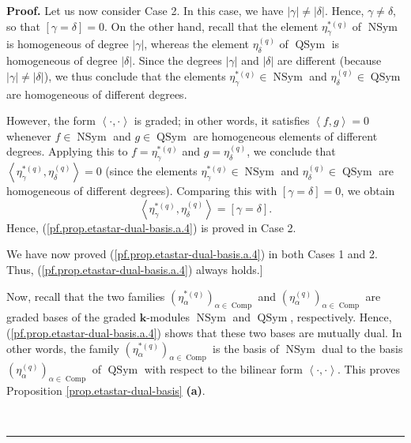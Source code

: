 \documentclass[numbers=enddot,12pt,final,onecolumn,notitlepage]{scrartcl}%
\theoremstyle{definition}
\newenvironment{proof}[1][Proof]{\noindent\textbf{#1.} }{\ \rule{0.5em}{0.5em}}
\newenvironment{verlong}{}{}
\begin{document}
\begin{proof}
\begin{verlong}
Let us now consider Case 2. In this case, we have $\left\vert \gamma
\right\vert \neq\left\vert \delta\right\vert $. Hence, $\gamma\neq\delta$, so
that $\left[  \gamma=\delta\right]  =0$. On the other hand, recall that the
element $\eta_{\gamma}^{\ast\left(  q\right)  }$ of $\operatorname*{NSym}$ is
homogeneous of degree $\left\vert \gamma\right\vert $, whereas the element
$\eta_{\delta}^{\left(  q\right)  }$ of $\operatorname*{QSym}$ is homogeneous
of degree $\left\vert \delta\right\vert $. Since the degrees $\left\vert
\gamma\right\vert $ and $\left\vert \delta\right\vert $ are different (because
$\left\vert \gamma\right\vert \neq\left\vert \delta\right\vert $), we thus
conclude that the elements $\eta_{\gamma}^{\ast\left(  q\right)  }%
\in\operatorname*{NSym}$ and $\eta_{\delta}^{\left(  q\right)  }%
\in\operatorname*{QSym}$ are homogeneous of different degrees.

However, the form $\left\langle \cdot,\cdot\right\rangle $ is graded; in other
words, it satisfies $\left\langle f,g\right\rangle =0$ whenever $f\in
\operatorname*{NSym}$ and $g\in\operatorname*{QSym}$ are homogeneous elements
of different degrees. Applying this to $f=\eta_{\gamma}^{\ast\left(  q\right)
}$ and $g=\eta_{\delta}^{\left(  q\right)  }$, we conclude that $\left\langle
\eta_{\gamma}^{\ast\left(  q\right)  },\eta_{\delta}^{\left(  q\right)
}\right\rangle =0$ (since the elements $\eta_{\gamma}^{\ast\left(  q\right)
}\in\operatorname*{NSym}$ and $\eta_{\delta}^{\left(  q\right)  }%
\in\operatorname*{QSym}$ are homogeneous of different degrees). Comparing this
with $\left[  \gamma=\delta\right]  =0$, we obtain
\[
\left\langle \eta_{\gamma}^{\ast\left(  q\right)  },\eta_{\delta}^{\left(
q\right)  }\right\rangle =\left[  \gamma=\delta\right]  .
\]
Hence, (\ref{pf.prop.etastar-dual-basis.a.4}) is proved in Case 2.

We have now proved (\ref{pf.prop.etastar-dual-basis.a.4}) in both Cases 1 and
2. Thus, (\ref{pf.prop.etastar-dual-basis.a.4}) always holds.]

Now, recall that the two families $\left(  \eta_{\alpha}^{\ast\left(
q\right)  }\right)  _{\alpha\in\operatorname*{Comp}}$ and $\left(
\eta_{\alpha}^{\left(  q\right)  }\right)  _{\alpha\in\operatorname*{Comp}}$
are graded bases of the graded $\mathbf{k}$-modules $\operatorname*{NSym}$ and
$\operatorname*{QSym}$, respectively. Hence,
(\ref{pf.prop.etastar-dual-basis.a.4}) shows that these two bases are mutually
dual. In other words, the family $\left(  \eta_{\alpha}^{\ast\left(  q\right)
}\right)  _{\alpha\in\operatorname*{Comp}}$ is the basis of
$\operatorname*{NSym}$ dual to the basis $\left(  \eta_{\alpha}^{\left(
q\right)  }\right)  _{\alpha\in\operatorname*{Comp}}$ of $\operatorname*{QSym}%
$ with respect to the bilinear form $\left\langle \cdot,\cdot\right\rangle $.
This proves Proposition \ref{prop.etastar-dual-basis} \textbf{(a)}. \qedhere


\end{verlong}
\end{proof}
\end{document}
